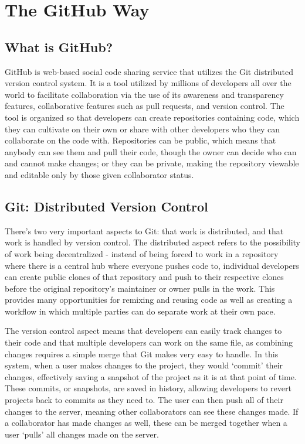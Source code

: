 \chapter{The GitHub Way}

\section{What is GitHub?}
GitHub is web-based social code sharing service that utilizes the Git distributed version control system. It is a tool utilized by millions of developers all over the world to facilitate collaboration via the use of its awareness and transparency features, collaborative features such as pull requests, and version control. The tool is organized so that developers can create repositories containing code, which they can cultivate on their own or share with other developers who they can collaborate on the code with. Repositories can be public, which means that anybody can see them and pull their code, though the owner can decide who can and cannot make changes; or they can be private, making the repository viewable and editable only by those given collaborator status.

\section{Git: Distributed Version Control}
There's two very important aspects to Git: that work is distributed, and that work is handled by version control. The distributed aspect refers to the possibility of work being decentralized - instead of being forced to work in a repository where there is a central hub where everyone pushes code to, individual developers can create public clones of that repository and push to their respective clones before the original repository's maintainer or owner pulls in the work. This provides many opportunities for remixing and reusing code as well as creating a workflow in which multiple parties can do separate work at their own pace.

The version control aspect means that developers can easily track changes to their code and that multiple developers can work on the same file, as combining changes requires a simple merge that Git makes very easy to handle. In this system, when a user makes changes to the project, they would `commit' their changes, effectively saving a snapshot of the project as it is at that point of time. These commits, or snapshots, are saved in history, allowing developers to revert projects back to commits as they need to. The user can then push all of their changes to the server, meaning other collaborators can see these changes made. If a collaborator has made changes as well, these can be merged together when a user `pulls' all changes made on the server.

